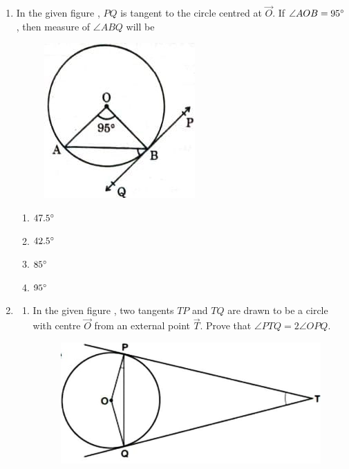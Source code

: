 
\begin{enumerate}
	\item In the given figure , $ PQ $ is tangent to the circle centred at $ \vec{O} $. If $ \angle{AOB} = 95{\degree} $, then measure of $ \angle{ABQ} $ will be
	\begin{figure}[H]
		\centering
		\includegraphics[width=\columnwidth]{figs/circle1.jpg}
		\caption{}
		\label{fig:circle1}
	\end{figure}
		\begin{enumerate}
			\item $ 47.5{\degree} $
			\item $ 42.5{\degree} $
			\item $ 85{\degree} $
			\item $ 95{\degree} $
		\end{enumerate}
	\item
		\begin{enumerate}
			\item In the given figure , two tangents $ TP $ and $ TQ $ are drawn to be a circle with centre $ \vec{O} $ from an external point $ \vec{T} $. Prove that $ \angle{PTQ} = 2\angle{OPQ} $.
		\begin{figure}[H]
			\centering
			\includegraphics[width=\columnwidth]{figs/circle2.jpg}

\end{figure}
\end{enumerate}
\end{enumerate}

